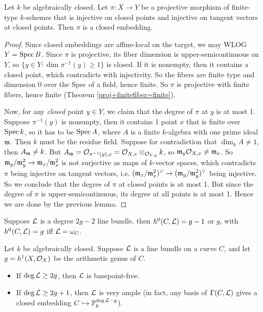 \documentclass[11pt]{amsart}
\begin{document}
\begin{thm}
Let $k$ be algebraically closed. Let $\pi: X\to Y$ be a projective morphism of finite-type $k$-schemes that is injective on closed points and injective on tangent vectors at closed points. Then $\pi$ is a closed embedding.
\end{thm}

\begin{proof}
Since closed embeddings are affine-local on the target, we may WLOG $Y = \operatorname{Spec} B$. Since $\pi$ is projective, its fiber dimension is upper-semicontinuous on $Y$, so $\{y\in Y: \dim \pi^{-1}(y) \ge 1\}$ is closed. If it is nonempty, then it contains a closed point, which contradicts with injectivity. So the fibers are finite type and dimension 0 over the Spec of a field, hence finite. So $\pi$ is projective with finite fibers, hence finite (Theorem \ref{proj+finitefiber=finite}). 

Now, for any \emph{closed} point $y\in Y$, we claim that the degree of $\pi$ at $y$ is at most 1. Suppose $\pi^{-1}(y)$ is nonempty, then it contains 1 point $x$ that is finite over $\operatorname{Spec} k$, so it has to be $\operatorname{Spec} A$, where $A$ is a finite $k$-algebra with one prime ideal $\mathfrak{m}$. Then $k$ must be the residue field. Suppose for contradiction that $\dim_{k} A\neq 1$, then $A_{\mathfrak{m}} \neq k$. But $A_{\mathfrak{m}} = \mathcal{O}_{\pi^{-1}(y), x} = \mathcal{O}_{X,x}\otimes_{\mathcal{O}_{Y,y}} k$, so $\mathfrak{m}_y\mathcal{O}_{X,x}\neq \mathfrak{m}_x$. So $\mathfrak{m}_y/\mathfrak{m}_y^2 \to \mathfrak{m}_x/\mathfrak{m}_x^2$ is not surjective as maps of $k$-vector spaces, which contradicts $\pi$ being injective on tangent vectors, i.e. $(\mathfrak{m}_x/\mathfrak{m}_x^2)^\vee \to (\mathfrak{m}_y/\mathfrak{m}_y^2)^\vee$ being injective. So we conclude that the degree of $\pi$ at closed points is at most 1. But since the degree of $\pi$ is upper-semicontinuous, its degree at all points is at most 1. Hence we are done by the previous lemma.
\end{proof}

\begin{lem}
Suppose $\mathcal{L}$ is a degree $2g-2$ line bundle, then $h^0(C, \mathcal{L}) = g-1$ or $g$, with $h^0(C, \mathcal{L}) = g$ iff $\mathcal{L} = \omega_C$.
\end{lem}

\begin{thm}
Let $k$ be algebraically closed. Suppose $\mathcal{L}$ is a line bundle on a curve $C$, and let $g = h^1(X, \mathcal{O}_X)$ be the arithmetic genus of $C$.
\begin{itemize}
\item If $\deg \mathcal{L} \ge 2g$, then $\mathcal{L}$ is basepoint-free.
\item If $\deg \mathcal{L} \ge 2g+1$, then $\mathcal{L}$ is very ample (in fact, any basis of $\Gamma(C, \mathcal{L})$ gives a closed embedding $C\hookrightarrow \mathbb{P}_k^{\deg \mathcal{L} - g}$).
\end{itemize}
\end{thm}
\end{document}
